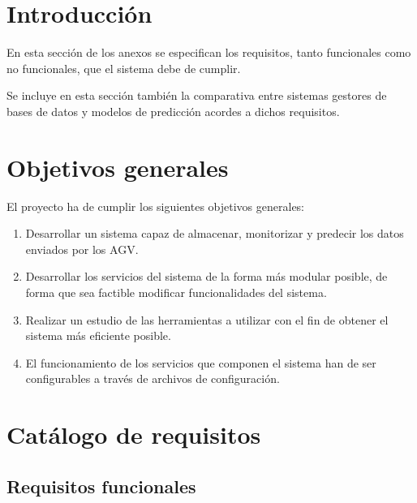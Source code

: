 
\section{Introducción}

En esta sección de los anexos se especifican los requisitos, tanto funcionales como no funcionales, que el sistema 
debe de cumplir.

Se incluye en esta sección también la comparativa entre sistemas gestores de bases de datos y modelos de predicción 
acordes a dichos requisitos.

\section{Objetivos generales}

El proyecto ha de cumplir los siguientes objetivos generales:
\begin{enumerate}
	\item Desarrollar un sistema capaz de almacenar, monitorizar y predecir los datos enviados por los AGV.
	\item Desarrollar los servicios del sistema de la forma más modular posible, de forma que sea factible modificar
		funcionalidades del sistema.
	\item Realizar un estudio de las herramientas a utilizar con el fin de obtener el sistema más eficiente posible.
	\item El funcionamiento de los servicios que componen el sistema han de ser configurables a través de archivos de
		configuración.
\end{enumerate}

\section{Catálogo de requisitos}

\subsection{Requisitos funcionales}

